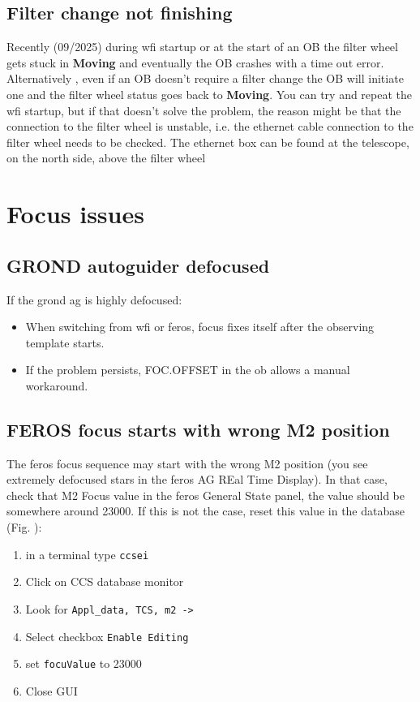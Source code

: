 \documentclass[11pt,fleqn,a4paper]{book}
\begin{document}
 
\subsection{Filter change not finishing}
\label{sec:filtertimeout}

Recently (09/2025) during \gls{wfi} startup or at the start of an OB the filter wheel gets stuck in {\bf{Moving}} and eventually the OB crashes with a time out error. Alternatively , even if an OB doesn't require a filter change the OB will initiate one and the filter wheel status goes back to {\bf{Moving}}.  You can try and repeat the \gls{wfi} startup, but if that doesn't solve the problem, the reason might be that the connection to the filter wheel is unstable, i.e. the ethernet cable connection to the filter wheel needs to be checked. The ethernet box can be found at the telescope, on the north side, above the filter wheel
\section{Focus issues}

\subsection{GROND autoguider defocused}

If the \gls{grond} \gls{ag} is highly defocused:
\begin{itemize}
  \item When switching from \gls{wfi} or \gls{feros}, \gls{focus} fixes itself after the observing \gls{template} starts.
  \item If the problem persists, FOC.OFFSET in the \gls{ob} allows a manual workaround.
\end{itemize}

\subsection{FEROS focus starts with wrong M2 position}
The \gls{feros} \gls{focus} sequence may start with the wrong M2 position (you see extremely defocused stars in the \gls{feros} AG REal Time Display). In that case, check that M2 Focus value in the \gls{feros} General State panel, the value should be somewhere around 23000. If this is not the case, reset this value in the database (Fig. ): 

\label{proc:ferosfocusstartvalue}
\begin{enumerate}
	\item in a terminal type \texttt{ccsei}
	\item Click on CCS database monitor
	\item Look for \texttt{Appl\_data, TCS, m2 ->} 
	\item Select checkbox \texttt{Enable Editing}
	\item set \texttt{focuValue} to 23000
	\item Close GUI
\end{enumerate} 
\end{document}
